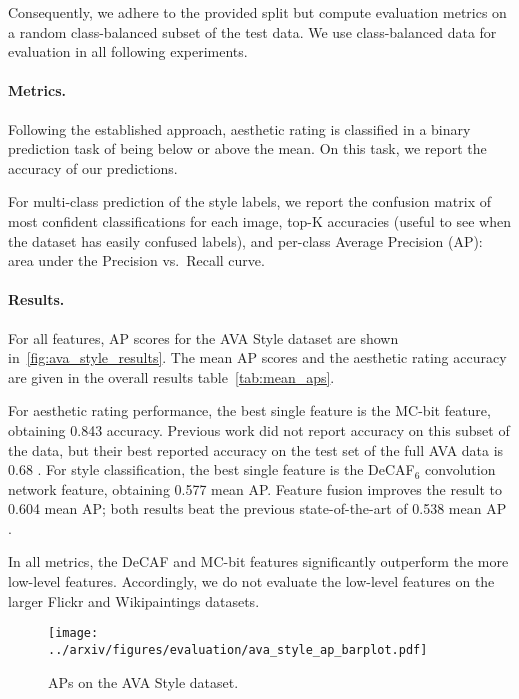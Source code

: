 Consequently, we adhere to the provided split but compute evaluation metrics on a random class-balanced subset of the test data.
We use class-balanced data for evaluation in all following experiments.

\vspace{-.5em}
\paragraph{Metrics.}
Following the established approach, aesthetic rating is classified in a binary prediction task of being below or above the mean.
On this task, we report the accuracy of our predictions.

For multi-class prediction of the style labels, we report the confusion matrix of most confident classifications for each image, top-K accuracies (useful to see when the dataset has easily confused labels), and per-class Average Precision (AP): area under the Precision vs.~Recall curve.

\vspace{-.5em}
\paragraph{Results.}
For all features, AP scores for the AVA Style dataset are shown in~\autoref{fig:ava_style_results}.
The mean AP scores and the aesthetic rating accuracy are given in the overall results table~\autoref{tab:mean_aps}.

For aesthetic rating performance, the best single feature is the MC-bit feature, obtaining 0.843 accuracy.
Previous work did not report accuracy on this subset of the data, but their best reported accuracy on the test set of the full AVA data is 0.68 \cite{Murray-CVPR-2012}.
For style classification, the best single feature is the DeCAF$_6$ convolution network feature, obtaining 0.577 mean AP.
Feature fusion improves the result to 0.604 mean AP; both results beat the previous state-of-the-art of 0.538 mean AP \cite{Murray-CVPR-2012}.

In all metrics, the DeCAF and MC-bit features significantly outperform the more low-level features.
Accordingly, we do not evaluate the low-level features on the larger Flickr and Wikipaintings datasets.

\begin{figure}
\centering
\texttt{[image: ../arxiv/figures/evaluation/ava\_style\_ap\_barplot.pdf]}
\caption{APs on the AVA Style dataset. }
\label{fig:ava_style_results}
\end{figure}

